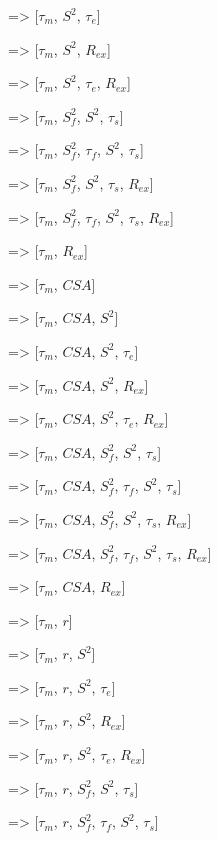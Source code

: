    => [$\tau_m$, $S^2$, $\tau_e$]
    
   => [$\tau_m$, $S^2$, $R_{ex}$]
    
   => [$\tau_m$, $S^2$, $\tau_e$, $R_{ex}$]
    
   => [$\tau_m$, $S^2_f$, $S^2$, $\tau_s$]
    
   => [$\tau_m$, $S^2_f$, $\tau_f$, $S^2$, $\tau_s$]
    
   => [$\tau_m$, $S^2_f$, $S^2$, $\tau_s$, $R_{ex}$]
    
   => [$\tau_m$, $S^2_f$, $\tau_f$, $S^2$, $\tau_s$, $R_{ex}$]
    
   => [$\tau_m$, $R_{ex}$]

    
  => [$\tau_m$, $CSA$]
    
  => [$\tau_m$, $CSA$, $S^2$]
    
  => [$\tau_m$, $CSA$, $S^2$, $\tau_e$]
    
  => [$\tau_m$, $CSA$, $S^2$, $R_{ex}$]
    
  => [$\tau_m$, $CSA$, $S^2$, $\tau_e$, $R_{ex}$]
    
  => [$\tau_m$, $CSA$, $S^2_f$, $S^2$, $\tau_s$]
    
  => [$\tau_m$, $CSA$, $S^2_f$, $\tau_f$, $S^2$, $\tau_s$]
    
  => [$\tau_m$, $CSA$, $S^2_f$, $S^2$, $\tau_s$, $R_{ex}$]
    
  => [$\tau_m$, $CSA$, $S^2_f$, $\tau_f$, $S^2$, $\tau_s$, $R_{ex}$]
    
  => [$\tau_m$, $CSA$, $R_{ex}$]

    
  => [$\tau_m$, $r$]
    
  => [$\tau_m$, $r$, $S^2$]
    
  => [$\tau_m$, $r$, $S^2$, $\tau_e$]
    
  => [$\tau_m$, $r$, $S^2$, $R_{ex}$]
    
  => [$\tau_m$, $r$, $S^2$, $\tau_e$, $R_{ex}$]
    
  => [$\tau_m$, $r$, $S^2_f$, $S^2$, $\tau_s$]
    
  => [$\tau_m$, $r$, $S^2_f$, $\tau_f$, $S^2$, $\tau_s$]
    
